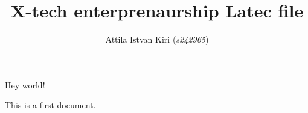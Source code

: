 \documentclass[a4paper,12pt]{article}
\title{X-tech enterprenaurship Latec file}
\author{Attila Istvan Kiri (\textit{s242965})}
\begin{document}
Hey world!

This is a first document.
\end{document}
